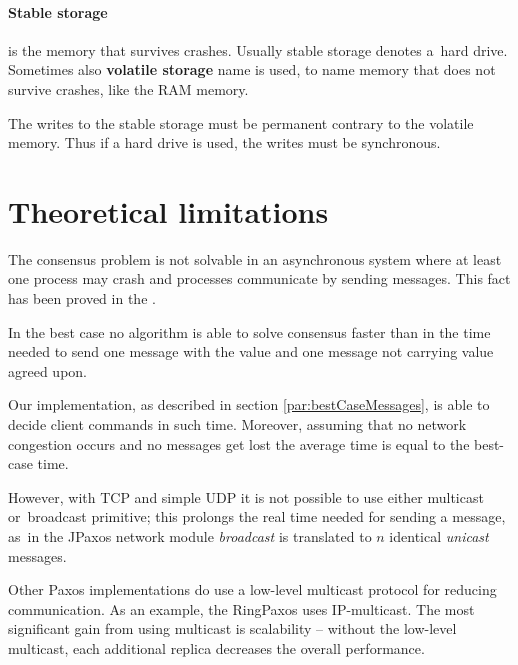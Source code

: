 \paragraph{Stable storage}
is the memory that survives crashes. Usually stable storage denotes a~hard drive.
Sometimes also \textbf{volatile storage} name is used, to name memory that does not survive crashes, like the RAM memory.

\noindent The writes to the stable storage must be permanent contrary to the volatile memory. Thus if a hard drive is used, the writes must be synchronous.

\section{Theoretical limitations}


The consensus problem is not solvable in an asynchronous system where at least one process may crash and processes communicate by sending messages. This fact has been proved in the \cite{FLP}.


In the best case no algorithm is able to solve consensus faster than in the time needed to send one message with the value and one message not carrying value agreed upon.

Our implementation, as described in section \ref{par:bestCaseMessages}, is able to decide client commands in such time. Moreover, assuming that no network congestion occurs and no messages get lost the average time is equal to the best-case time.

However, with TCP and simple UDP it is not possible to use either multicast or~broadcast primitive; this prolongs the real time needed for sending a message, as~in the JPaxos network module \emph{broadcast} is translated to $n$ identical \textit{unicast} messages.

Other Paxos implementations do use a low-level multicast protocol for reducing communication. As an example, the RingPaxos \cite{Mar10} uses IP-multicast. The most significant gain from using multicast is scalability -- without the low-level multicast, each additional replica decreases the overall performance.

